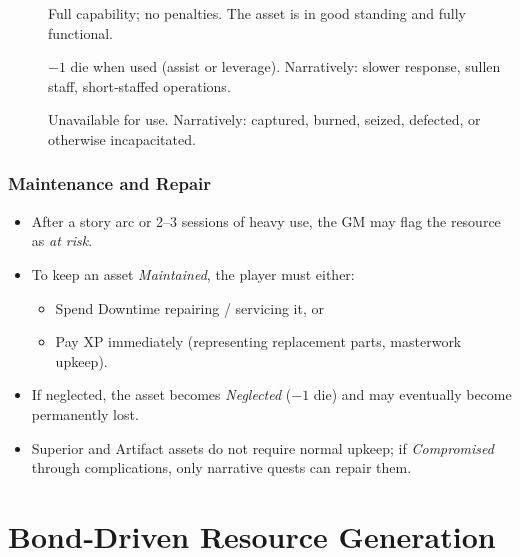 \begin{description}
    \item[] Full capability; no penalties. The asset is in good standing and fully functional.
    \item[] \(-1\) die when used (assist or leverage). Narratively: slower response, sullen staff, short‑staffed operations.
    \item[] Unavailable for use. Narratively: captured, burned, seized, defected, or otherwise incapacitated.
\end{description}

\subsubsection{Maintenance and Repair}\label{subsec:asset_maintenance}

\begin{itemize}
    \item After a story arc or 2--3 sessions of heavy use, the GM may flag the resource as \emph{at risk}.
    \item To keep an asset \emph{Maintained}, the player must either:
        \begin{itemize}
            \item Spend Downtime repairing / servicing it, or
            \item Pay XP immediately (representing replacement parts, masterwork upkeep).
        \end{itemize}
    \item If neglected, the asset becomes \emph{Neglected} (\(-1\) die) and may eventually become permanently lost.
    \item Superior and Artifact assets do not require normal upkeep; if \emph{Compromised} through complications, only narrative quests can repair them.
\end{itemize}

\section{Bond‑Driven Resource Generation}\label{sec:bond_resources}

